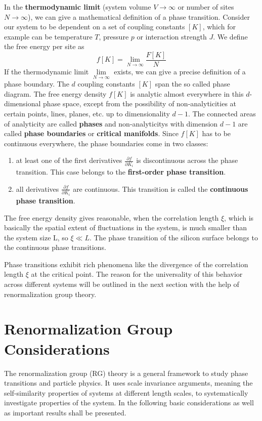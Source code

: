 	In the \textbf{thermodynamic limit} (system volume $V \rightarrow \infty$ or number of sites $N \rightarrow \infty$), we can give a mathematical definition of a phase transition. Consider our system to be dependent on a set of coupling constants $[K]$, which for example can be temperature $T$, pressure $p$ or interaction strength $J$. We define the free energy per site as
	\begin{equation}
		f[K] =	\lim\limits_{N \rightarrow \infty} \frac{F[K]}{N}
	\end{equation}
	If the thermodynamic limit $\lim\limits_{N\rightarrow \infty}$ exists, we can give a precise definition of a phase boundary. The $d$ coupling constants $[K]$ span the so called phase diagram. The free energy density $f[K]$ is analytic almost everywhere in this $d$-dimensional phase space, except from the possibility of non-analyticities at certain points, lines, planes, etc. up to dimensionality $d-1$. The connected areas of analyticity are called \textbf{phases} and non-analyticitys with dimension $d-1$ are called \textbf{phase boundaries} or \textbf{critical manifolds}. Since $f[K]$ has to be continuous everywhere, the phase boundaries come in two classes:
	\begin{enumerate}
		\item at least one of the first derivatives $\frac{\partial f}{\partial K_i}$ is discontinuous across the phase transition. This case belongs to the \textbf{first-order phase transition}.
		\item all derivatives $\frac{\partial f}{\partial K_i}$ are continuous. This transition is called the \textbf{continuous phase transition}. 
	\end{enumerate}
	The free energy density gives reasonable, when the correlation length $\xi$, which is basically the spatial extent of fluctuations in the system, is much smaller than the system size L, so $\xi \ll L$. 
	The phase transition of the silicon surface belongs to the continuous phase transitions. 
	
	Phase transitions exhibit rich phenomena like the divergence of the correlation length $\xi$ at the critical point. The reason for the universality of this behavior across different systems will be outlined in the next section with the help of renormalization group theory.
	\section{Renormalization Group Considerations} \label{Section::RG}
	The renormalization group (RG) theory is a general framework to study phase transitions and particle physics. It uses scale invariance arguments, meaning the self-similarity properties of systems at different length scales, to systematically investigate properties of the system. In the following basic considerations as well as important results shall be presented. \\
	
